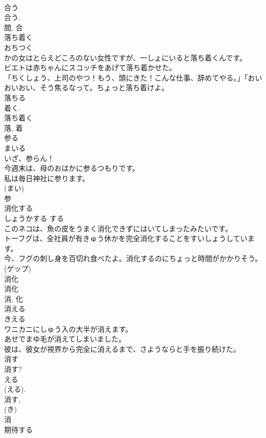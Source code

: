 \documentclass[8pt]{extreport}
\begin{document}
\begin{CJK}{UTF8}{min}
\\	合う 
\\	合う. 
\\	間, 合	
\\	落ち着く	
\\	おちつく	
\\	かの女はとらえどころのない女性ですが、一しょにいると落ち着くんです。	
\\	ビエトは赤ちゃんにスコッチをあげて落ち着かせた。	
\\	「ちくしょう、上司のやつ！もう、頭にきた！こんな仕事、辞めてやる。」「おいおいおい、そう焦るなって。ちょっと落ち着けよ。 
\\	落ちる 
\\	着く. 
\\	落ち着く 
\\	落, 着	
\\	参る	
\\	まいる	
\\	いざ、参らん！	
\\	今週末は、母のおはかに参るつもりです。	
\\	私は毎日神社に参ります。	
\\	(まい) 
\\	参	
\\	消化する	
\\	しょうかする	する 
\\	このネコは、魚の皮をうまく消化できずにはいてしまったみたいです。	
\\	トーフグは、全社員が有きゅう休かを完全消化することをすいしょうしています。	
\\	今、フグの刺し身を百切れ食べたよ。消化するのにちょっと時間がかかりそう。(ゲップ)	
\\	消化 
\\	消化 
\\	消, 化	
\\	消える	
\\	きえる	
\\	ワニカニにしゅう入の大半が消えます。	
\\	あせでまゆ毛が消えてしまいました。	
\\	彼は、彼女が視界から完全に消えるまで、さようならと手を振り続けた。	
\\	消す 
\\	消す? 
\\	える 
\\	(える). 
\\	消す, 
\\	(き) 
\\	消	
\\	期待する	

\end{CJK}
\end{document}
